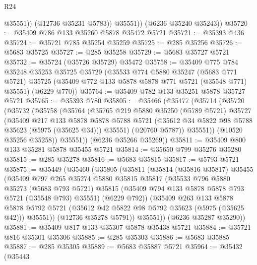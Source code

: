 \begin{lexlean}{R24}
\begin{coremodule}
                @35551))
            (@12736 @35231 @5783))
          @35551))
      (@6236 @35240 @35243))
@35720 := @35409 @786 @133 @35260 @5878 @35472 @5721
@35721 := @35393 @436
@35724 := @35721 @785 @35254 @35259
@35725 := @285 @35256
@35726 := @5683 @35725
@35727 := @285 @35258
@35729 := @5683 @35727 @5721
@35732 := @35724 (@35726 @35729) @35472
@35758 := @35409
    @775
    @784
    @35248
    @35253
    @35725
    @35729
    (@35533
      @774
      @5880
      @35247
      (@5683 @771 @5721)
      @35725
      (@35409 @772 @133 @5878 @5878 @771 @5721 (@35548 @771) @35551)
      (@6229 @770))
@35764 := @35409 @782 @133 @35251 @5878 @35727 @5721
@35765 := @35393 @780
@35805 := @35466
    (@35477
      (@35714
        (@35720
          (@35732
            (@35758
              (@35764
                (@35765
                  @219
                  @5880
                  @35250
                  (@5789 @5721)
                  @35727
                  (@35409
                    @217
                    @133
                    @5878
                    @5878
                    @5788
                    @5721
                    (@35612 @34 @5822 @98 @5788 @35623 (@5975 (@35625 @34)))
                    @35551)
                  (@20760 @5787))
                @35551))
            (@10520 @35256 @35258))
          @35551))
      (@6236 @35266 @35269))
@35811 := @35409 @800 @133 @35281 @5878 @35455 @5721
@35814 := @35650 @799 @35276 @35280
@35815 := @285 @35278
@35816 := @5683 @35815
@35817 := @5793 @5721
@35875 := @35449
    (@35460
      (@35805
        (@35811
          (@35814
            (@35816 @35817)
            @35455
            (@35409
              @797
              @265
              @35274
              @5880
              @35815
              @35817
              (@35533
                @796
                @5880
                @35273
                (@5683 @793 @5721)
                @35815
                (@35409 @794 @133 @5878 @5878 @793 @5721 (@35548 @793) @35551)
                (@6229 @792))
              (@35409
                @263
                @133
                @5878
                @5878
                @5792
                @5721
                (@35612 @42 @5822 @98 @5792 @35623 (@5975 (@35625 @42)))
                @35551))
            (@12736 @35278 @5791))
          @35551))
      (@6236 @35287 @35290))
@35881 := @35409 @817 @133 @35307 @5878 @35438 @5721
@35884 := @35721 @816 @35301 @35306
@35885 := @285 @35303
@35886 := @5683 @35885
@35887 := @285 @35305
@35889 := @5683 @35887 @5721
@35964 := @35432
    (@35443

\end{coremodule}
\end{lexlean}
